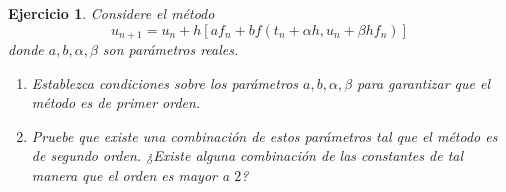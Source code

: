 \documentclass[11pt]{article}
\newtheorem{exercise}{Ejercicio}
\begin{document}
\begin{exercise}
  Considere el método
  \begin{equation}
    u_{n+1} = u_n + h[af_n + bf(t_n+\alpha h,u_n+\beta h f_n)]
  \end{equation}
  donde $a,b,\alpha,\beta$ son parámetros reales.
  \begin{enumerate}
    \item
      Establezca condiciones sobre los parámetros $a,b,\alpha,\beta$ 
      para garantizar que el método es de primer orden.
    \item
      Pruebe que existe una combinación de estos parámetros tal que el
      método es de segundo orden. ¿Existe alguna combinación de las
      constantes de tal manera que el orden es mayor a $2$?
  \end{enumerate}
\end{exercise}
\end{document}
